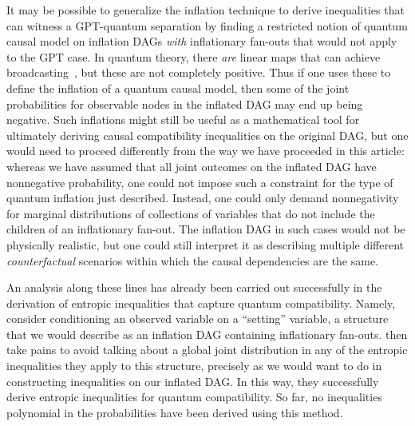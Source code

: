 {It may be possible to generalize the inflation technique to derive inequalities that can witness a GPT-quantum separation by finding a restricted notion of quantum causal model on inflation DAGs \emph{with} inflationary fan-outs that would not apply to the GPT case.
In quantum theory, there {\em are} linear maps that can achieve broadcasting~\cite{Coecke2011}, but these are not completely positive. Thus if one uses these to define the inflation of a quantum causal model, then some of the joint probabilities for observable nodes in the inflated DAG may end up being negative.  Such inflations might still be useful as a mathematical tool for ultimately deriving causal compatibility inequalities on the original DAG, but one would need to proceed differently from the way we have proceeded in this article: whereas we have assumed that all joint outcomes on the inflated DAG have nonnegative probability, one could not impose such a constraint for the type of quantum inflation just described.  Instead, one could only demand nonnegativity for marginal distributions of collections of variables that do not include the children of an inflationary fan-out. The inflation DAG in such cases would not be physically realistic, but one could still interpret it as describing multiple different {\em counterfactual} scenarios within which the causal dependencies are the same.

An analysis along these lines has already been carried out successfully in the derivation of entropic inequalities that capture quantum compatibility. Namely, \citet{Chaves2015infoquantum} consider conditioning an observed variable on a ``setting'' variable, a structure that we would describe as an inflation DAG containing inflationary fan-outs. \citet{Chaves2015infoquantum} then take pains to avoid talking about a global joint distribution in any of the entropic inequalities they apply to this structure, %
precisely as we would want to do in constructing inequalities on our inflated DAG. In this way, they successfully derive entropic inequalities for quantum compatibility. So far, no inequalities polynomial in the probabilities have been derived using this method.


}
